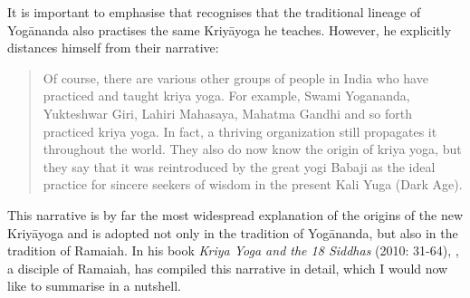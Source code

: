 It is important to emphasise that \citeauthor{kriyayogasarasvati1981} recognises that the traditional lineage of Yogānanda also practises the same Kriyāyoga he teaches. However, he explicitly distances himself from their narrative: \begin{quote} Of course, there are various other groups of people in India who have practiced and taught kriya yoga. For example, Swami Yogananda, Yukteshwar Giri, Lahiri Mahasaya, Mahatma Gandhi and so forth practiced kriya yoga. In fact, a thriving organization still propagates it throughout the world. They also do now know the origin of kriya yoga, but they say that it was reintroduced by the great yogi Babaji as the ideal practice for sincere seekers of wisdom in the present Kali Yuga (Dark Age). \end{quote}

This narrative is by far the most widespread explanation of the origins of the new Kriyāyoga and is adopted not only in the tradition of Yogānanda, but also in the tradition of Ramaiah. In his book \textit{Kriya Yoga and the 18 Siddhas} (2010: 31-64), \citeauthor{govindan2010}, a disciple of Ramaiah, has compiled this narrative in detail, which I would now like to summarise in a nutshell.

